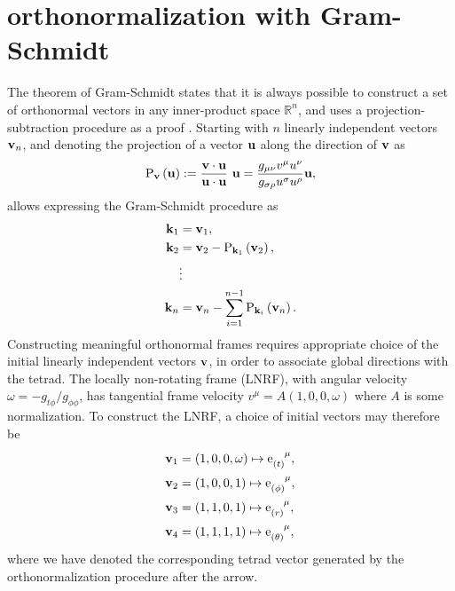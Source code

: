 \section{orthonormalization with Gram-Schmidt}
\label{appendix:gram-schmidt}

The theorem of Gram-Schmidt states that it is always possible to construct a set of orthonormal vectors in any inner-product space $\mathbb{R}^n$, and uses a projection-subtraction procedure as a proof \citep{schmidt_uber_1989}. Starting with $n$ linearly independent vectors $\mathbf{v}_n$, and denoting the projection of a vector $\mathbf{u}$ along the direction of $\mathbf{v}$ as
\begin{equation}
\mathrm{P}_{\vector{v}}\left(\vector{u}\right) := \frac{\vector{v} \cdot \vector{u}}{\vector{u} \cdot \vector{u}}\ \vector{u} = \frac{g_{\mu\nu} v^\mu u^\nu}{g_{\sigma\rho} u^\sigma u^\rho} \vector{u},
\end{equation}
allows expressing the Gram-Schmidt procedure as
\begin{align}
    \mathbf{k}_1 &= \mathbf{v}_1, \nonumber \\
    \mathbf{k}_2 &= \mathbf{v}_2 - \mathrm{P}_{\mathbf{k}_1}\left(\mathbf{v}_2 \right), \nonumber \\
    &\vdots \nonumber \\
    \mathbf{k}_n &= \mathbf{v}_n - \sum_{i = 1}^{n-1} \mathrm{P}_{\mathbf{k}_i} \left(\mathbf{v}_n \right).
\end{align}
Constructing meaningful orthonormal frames requires appropriate choice of the initial linearly independent vectors $\mathbf{v}$, in order to associate global directions with the tetrad. The locally non-rotating frame (LNRF), with angular velocity $\omega = -g_{t\phi} / g_{\phi\phi}$, has tangential frame velocity $v^\mu = A (1, 0, 0, \omega)$ where $A$ is some normalization. To construct the LNRF, a choice of initial vectors may therefore be
\begin{align}
    \vector{v}_1 &= \left(1, 0, 0, \omega \right) \mapsto \dtensor{\e}{(t)}{\mu}, \nonumber \\
    \vector{v}_2 &= \left(1, 0, 0, 1\right) \mapsto \dtensor{\e}{(\phi)}{\mu}, \nonumber \\
    \vector{v}_3 &= \left(1, 1, 0, 1\right) \mapsto \dtensor{\e}{(r)}{\mu}, \nonumber \\
    \vector{v}_4 &= \left(1, 1, 1, 1\right) \mapsto \dtensor{\e}{(\theta)}{\mu},
\end{align}
where we have denoted the corresponding tetrad vector generated by the orthonormalization procedure after the arrow.


